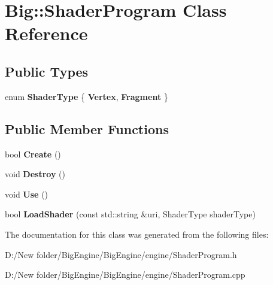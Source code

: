 \hypertarget{class_big_1_1_shader_program}{}\section{Big\+:\+:Shader\+Program Class Reference}
\label{class_big_1_1_shader_program}
\subsection*{Public Types}
\begin{DoxyCompactItemize}
\item 
\mbox{\label{class_big_1_1_shader_program_aa33237853d406cdcae965dbf9ef5cc0e}} 
enum {\bfseries Shader\+Type} \{ {\bfseries Vertex}, 
{\bfseries Fragment}
 \}
\end{DoxyCompactItemize}
\subsection*{Public Member Functions}
\begin{DoxyCompactItemize}
\item 
\mbox{\label{class_big_1_1_shader_program_a815c88e3ca7fa6ccb40928754ea44600}} 
bool {\bfseries Create} ()
\item 
\mbox{\label{class_big_1_1_shader_program_a093d8d4807e1dfcc12c01309b8e3cbfd}} 
void {\bfseries Destroy} ()
\item 
\mbox{\label{class_big_1_1_shader_program_af92007aa1a9b5455c3f5a52d79c2ec9a}} 
void {\bfseries Use} ()
\item 
\mbox{\label{class_big_1_1_shader_program_afdda0715b94814ceb0bdda8f4d03e9b3}} 
bool {\bfseries Load\+Shader} (const std\+::string \&uri, Shader\+Type shader\+Type)
\end{DoxyCompactItemize}


The documentation for this class was generated from the following files\+:\begin{DoxyCompactItemize}
\item 
D\+:/\+New folder/\+Big\+Engine/\+Big\+Engine/engine/Shader\+Program.\+h\item 
D\+:/\+New folder/\+Big\+Engine/\+Big\+Engine/engine/Shader\+Program.\+cpp\end{DoxyCompactItemize}
